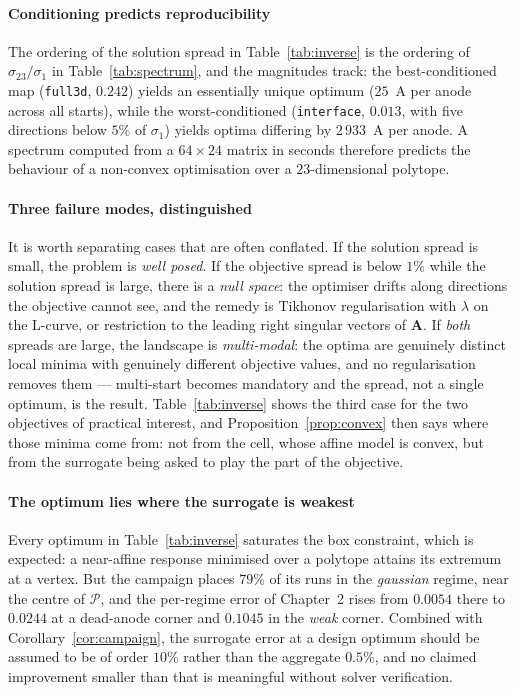 \documentclass[11pt,a4paper]{article}
\newcommand{\vect}[1]{\mathbf{#1}}
\theoremstyle{plain}
\theoremstyle{definition}
\theoremstyle{remark}
\begin{document}
\label{meas:predict}
\paragraph{Conditioning predicts reproducibility}
The ordering of the solution spread in Table~\ref{tab:inverse} is the ordering
of $\sigma_{23}/\sigma_1$ in Table~\ref{tab:spectrum}, and the magnitudes track:
the best-conditioned map (\texttt{full3d}, $0.242$) yields an essentially unique
optimum ($25$~A per anode across all starts), while the worst-conditioned
(\texttt{interface}, $0.013$, with five directions below $5\%$ of $\sigma_1$)
yields optima differing by $2\,933$~A per anode. A spectrum computed from a
$64\times24$ matrix in seconds therefore predicts the behaviour of a non-convex
optimisation over a $23$-dimensional polytope.

\label{rem:three-modes}
\paragraph{Three failure modes, distinguished}
It is worth separating cases that are often conflated. If the solution spread is
small, the problem is \emph{well posed}. If the objective spread is below $1\%$
while the solution spread is large, there is a \emph{null space}: the optimiser
drifts along directions the objective cannot see, and the remedy is Tikhonov
regularisation with $\lambda$ on the L-curve, or restriction to the leading right
singular vectors of $\vect{A}$. If \emph{both} spreads are large, the landscape
is \emph{multi-modal}: the optima are genuinely distinct local minima with
genuinely different objective values, and no regularisation removes them ---
multi-start becomes mandatory and the spread, not a single optimum, is the
result. Table~\ref{tab:inverse} shows the third case for the two objectives of
practical interest, and Proposition~\ref{prop:convex} then says where those
minima come from: not from the cell, whose affine model is convex, but from the
surrogate being asked to play the part of the objective.

\paragraph{The optimum lies where the surrogate is weakest}
Every optimum in Table~\ref{tab:inverse} saturates the box constraint, which is
expected: a near-affine response minimised over a polytope attains its extremum
at a vertex. But the campaign places $79\%$ of its runs in the
\textit{gaussian} regime, near the centre of $\mathcal{P}$, and the per-regime
error of Chapter~2 rises from $0.0054$ there to $0.0244$ at a dead-anode corner
and $0.1045$ in the \textit{weak} corner. Combined with
Corollary~\ref{cor:campaign}, the surrogate error at a design optimum should be
assumed to be of order $10\%$ rather than the aggregate $0.5\%$, and no claimed
improvement smaller than that is meaningful without solver verification.
\end{document}
